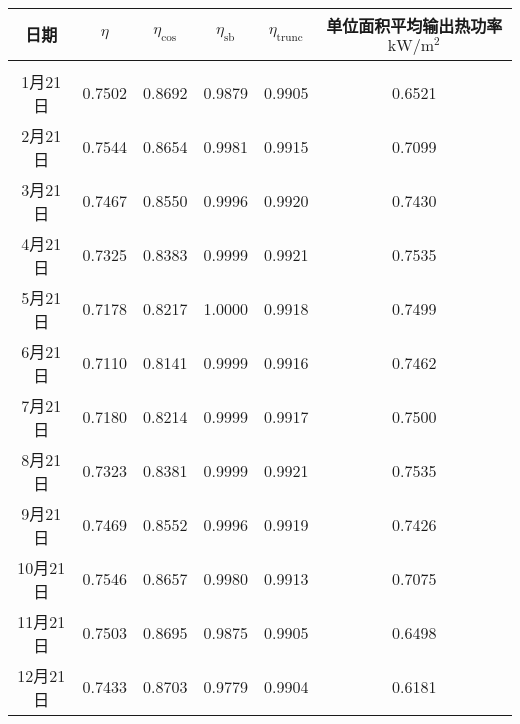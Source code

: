 \begin{tabular}{|c|ccccc|}
\hline
日期 & \(\eta\) & \(\eta _{\cos}\) & \(\eta _{\mathrm{s b}}\) & \(\eta _{\mathrm{trunc}}\) & 单位面积平均输出热功率\(\mathrm{kW}/\mathrm{m}^{2}\)\\
\hline
\\[-1em]
1月21日  & 0.7502&0.8692&0.9879&0.9905&0.6521\\
2月21日  & 0.7544&0.8654&0.9981&0.9915&0.7099\\
3月21日  & 0.7467&0.8550&0.9996&0.9920&0.7430\\
4月21日  & 0.7325&0.8383&0.9999&0.9921&0.7535\\
5月21日  & 0.7178&0.8217&1.0000&0.9918&0.7499\\
6月21日  & 0.7110&0.8141&0.9999&0.9916&0.7462\\
7月21日  & 0.7180&0.8214&0.9999&0.9917&0.7500\\
8月21日  & 0.7323&0.8381&0.9999&0.9921&0.7535\\
9月21日  & 0.7469&0.8552&0.9996&0.9919&0.7426\\
10月21日 & 0.7546&0.8657&0.9980&0.9913&0.7075\\
11月21日 & 0.7503&0.8695&0.9875&0.9905&0.6498\\
12月21日 & 0.7433&0.8703&0.9779&0.9904&0.6181\\
\hline
\end{tabular}
